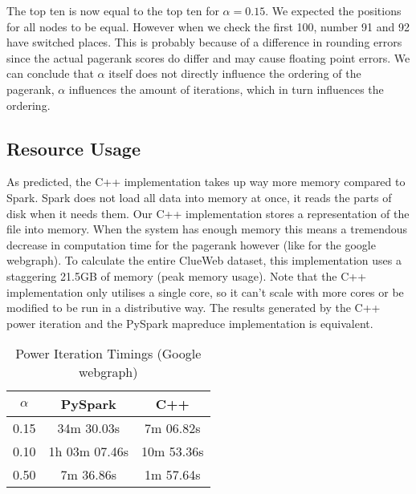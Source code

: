 \documentclass{article}
\begin{document}
The top ten is now equal to the top ten for $\alpha = 0.15$. We expected the positions for all nodes to be equal. However when we check the first 100, number 91 and 92 have switched places. This is probably because of a difference in rounding errors since the actual pagerank scores do differ and may cause floating point errors. We can conclude that $\alpha$ itself does not directly influence the ordering of the pagerank, $\alpha$ influences the amount of iterations, which in turn influences the ordering.

\subsection{Resource Usage}
As predicted, the C++ implementation takes up way more memory compared to Spark. Spark does not load all data into memory at once, it reads the parts of disk when it needs them. Our C++ implementation stores a representation of the file into memory. When the system has enough memory this means a tremendous decrease in computation time for the pagerank however (like for the google webgraph). To calculate the entire ClueWeb dataset, this implementation uses a staggering 21.5GB of memory (peak memory usage). Note that the C++ implementation only utilises a single core, so it can't scale with more cores or be modified to be run in a distributive way. The results generated by the C++ power iteration and the PySpark mapreduce implementation is equivalent.

\begin{table}[H]
    \centering
    \begin{tabular}{|c|c|c|}
        \hline
        $\alpha$ & PySpark & C++ \\ \hline
        0.15 & 34m 30.03s & 7m 06.82s \\ \hline
        0.10 & 1h 03m 07.46s & 10m 53.36s \\ \hline
        0.50 & 7m 36.86s & 1m 57.64s \\ \hline
    \end{tabular}
    \caption{Power Iteration Timings (Google webgraph)}
    \label{tab:timing}
\end{table}



\end{document}
